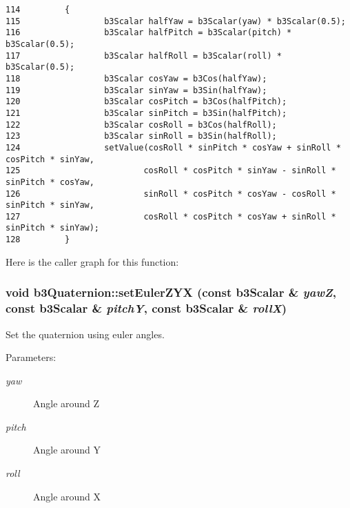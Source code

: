 \begin{Code}\begin{verbatim}114         {
115                 b3Scalar halfYaw = b3Scalar(yaw) * b3Scalar(0.5);  
116                 b3Scalar halfPitch = b3Scalar(pitch) * b3Scalar(0.5);  
117                 b3Scalar halfRoll = b3Scalar(roll) * b3Scalar(0.5);  
118                 b3Scalar cosYaw = b3Cos(halfYaw);
119                 b3Scalar sinYaw = b3Sin(halfYaw);
120                 b3Scalar cosPitch = b3Cos(halfPitch);
121                 b3Scalar sinPitch = b3Sin(halfPitch);
122                 b3Scalar cosRoll = b3Cos(halfRoll);
123                 b3Scalar sinRoll = b3Sin(halfRoll);
124                 setValue(cosRoll * sinPitch * cosYaw + sinRoll * cosPitch * sinYaw,
125                         cosRoll * cosPitch * sinYaw - sinRoll * sinPitch * cosYaw,
126                         sinRoll * cosPitch * cosYaw - cosRoll * sinPitch * sinYaw,
127                         cosRoll * cosPitch * cosYaw + sinRoll * sinPitch * sinYaw);
128         }
\end{verbatim}
\end{Code}




Here is the caller graph for this function:\hypertarget{classb3_quaternion_78e3817a97a72fd1e32d4d17e40be362}{
\subsubsection[setEulerZYX]{\setlength{\rightskip}{0pt plus 5cm}void b3Quaternion::setEulerZYX (const b3Scalar \& {\em yawZ}, \/  const b3Scalar \& {\em pitchY}, \/  const b3Scalar \& {\em rollX})}}
\label{classb3_quaternion_78e3817a97a72fd1e32d4d17e40be362}


Set the quaternion using euler angles. 

\begin{Desc}
\item[Parameters:]
\begin{description}
\item[{\em yaw}]Angle around Z \item[{\em pitch}]Angle around Y \item[{\em roll}]Angle around X \end{description}
\end{Desc}


